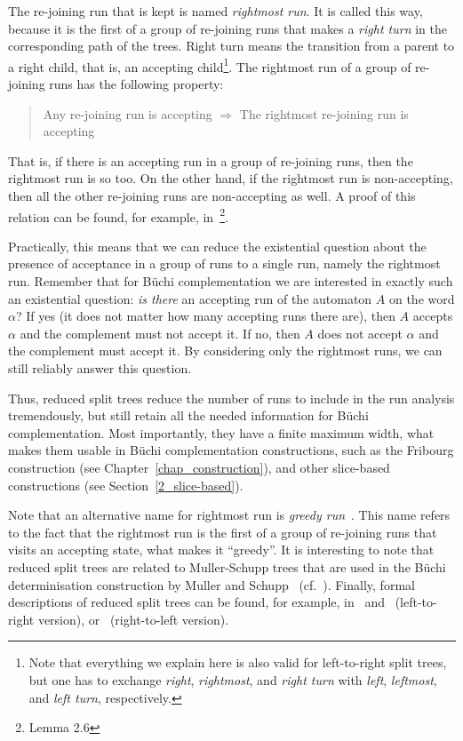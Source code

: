 The re-joining run that is kept is named \textit{rightmost run}. It is called this way, because it is the first of a group of re-joining runs that makes a \textit{right turn} in the corresponding path of the trees. Right turn means the transition from a parent to a right child, that is, an accepting child\footnote{Note that everything we explain here is also valid for left-to-right split trees, but one has to exchange \textit{right}, \textit{rightmost}, and \textit{right turn} with \textit{left}, \textit{leftmost}, and \textit{left turn}, respectively.}. The rightmost run of a group of re-joining runs has the following property:

\begin{quote}
\centering
Any re-joining run is accepting $\Longrightarrow$ The rightmost re-joining run is accepting
\end{quote}

That is, if there is an accepting run in a group of re-joining runs, then the rightmost run is so too. On the other hand, if the rightmost run is non-accepting, then all the other re-joining runs are non-accepting as well. A proof of this relation can be found, for example, in~\cite{vardi2007automata}\footnote{Lemma 2.6}.

Practically, this means that we can reduce the existential question about the presence of acceptance in a group of runs to a single run, namely the rightmost run. Remember that for Büchi complementation we are interested in exactly such an existential question: \textit{is there} an accepting run of the automaton $A$ on the word $\alpha$? If yes (it does not matter how many accepting runs there are), then $A$ accepts $\alpha$ and the complement must not accept it. If no, then $A$ does not accept $\alpha$ and the complement must accept it. By considering only the rightmost runs, we can still reliably answer this question.

Thus, reduced split trees reduce the number of runs to include in the run analysis tremendously, but still retain all the needed information for Büchi complementation. Most importantly, they have a finite maximum width, what makes them usable in Büchi complementation constructions, such as the Fribourg construction (see Chapter~\ref{chap_construction}), and other slice-based constructions (see Section~\ref{2_slice-based}).

Note that an alternative name for rightmost run is \textit{greedy run}~\cite{2014_joel_ulrich}. This name refers to the fact that the rightmost run is the first of a group of re-joining runs that visits an accepting state, what makes it ``greedy''. It is interesting to note that reduced split trees are related to Muller-Schupp trees that are used in the Büchi determinisation construction by Muller and Schupp~\cite{Muller199569} (cf.~\cite{vardi2007automata,fogarty2013unifying}). Finally, formal descriptions of reduced split trees can be found, for example, in~\cite{vardi2007automata} and~\cite{2014_wilke} (left-to-right version), or~\cite{fogarty2013unifying} (right-to-left version).


